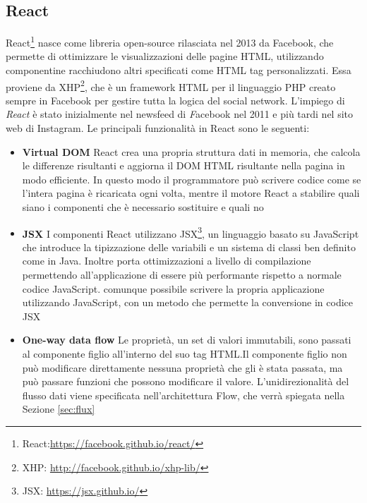 \subsection{React}\label{sec:react}

React\footnote{React:\url{https://facebook.github.io/react/}} nasce come libreria open-source rilasciata nel 2013 da Facebook, che permette di ottimizzare le visualizzazioni delle pagine HTML, utilizzando componentine racchiudono altri specificati come HTML tag personalizzati.
Essa proviene da XHP\footnote{XHP: \url{http://facebook.github.io/xhp-lib/}}, che è un framework HTML per il linguaggio PHP creato sempre in Facebook per gestire tutta la logica del social network. L'impiego di \emph{React} è stato inizialmente nel newsfeed di \emph Facebook nel 2011 e più tardi nel sito web di Instagram.
Le principali funzionalità in React sono le seguenti:
\begin{itemize}
	\item \textbf{Virtual DOM}
	React crea una propria struttura dati in memoria, che calcola le differenze risultanti e aggiorna il DOM HTML risultante nella pagina in modo efficiente. In questo modo il programmatore può scrivere codice come se l'intera pagina è ricaricata ogni volta, mentre il motore React a stabilire quali siano i componenti che è necessario sostituire e quali no
	 
	\item \textbf{JSX}
	I componenti React utilizzano JSX\footnote{JSX: \url{https://jsx.github.io/}}, un linguaggio basato su JavaScript che introduce la tipizzazione delle variabili e un sistema di classi ben definito come in Java. Inoltre porta ottimizzazioni a livello di compilazione permettendo all'applicazione di essere più performante rispetto a normale codice JavaScript. \upe comunque possibile scrivere la propria applicazione utilizzando JavaScript, con un metodo che permette la conversione in codice JSX
	
	\item \textbf{One-way data flow} Le proprietà, un set di valori immutabili, sono passati al componente figlio all'interno del suo tag HTML.Il componente figlio non può modificare direttamente nessuna proprietà che gli è stata passata, ma può passare funzioni che possono modificare il valore. 
	L'unidirezionalità del flusso dati viene specificata nell'architettura Flow, che verrà spiegata nella Sezione \ref{sec:flux}
\end{itemize}

